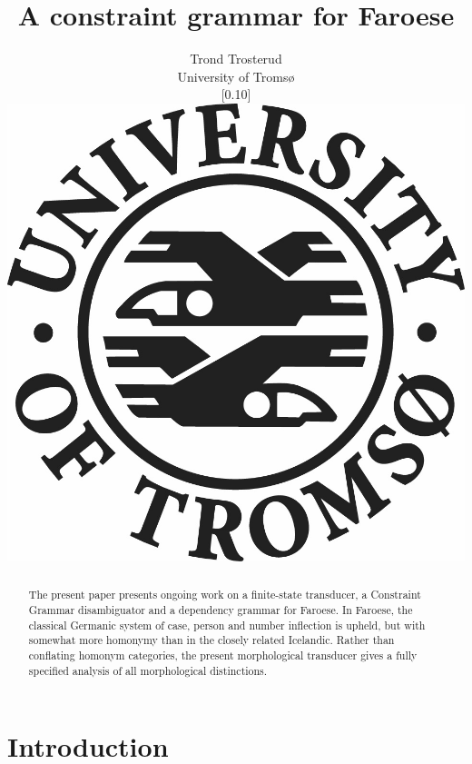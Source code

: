\documentclass{article}
\begin{document}
\title{A constraint grammar for Faroese}
\author{Trond Trosterud \\ 
University of Tromsø \begin{figure}  \scalebox{0.10}[0.10]{\includegraphics{img/LogoEngelsk}} \end{figure} 
}
\date{}

\maketitle

\begin{abstract}
The present paper presents ongoing work on a finite-state transducer, a Constraint Grammar disambiguator and a dependency grammar for Faroese. In Faroese, the classical Germanic system of case, person and number inflection is upheld, but with somewhat more homonymy than in the closely related Icelandic. Rather than conflating homonym categories, the present morphological transducer gives a fully specified analysis of all morphological distinctions. 
\end{abstract}

\section{Introduction} 
\end{document}
